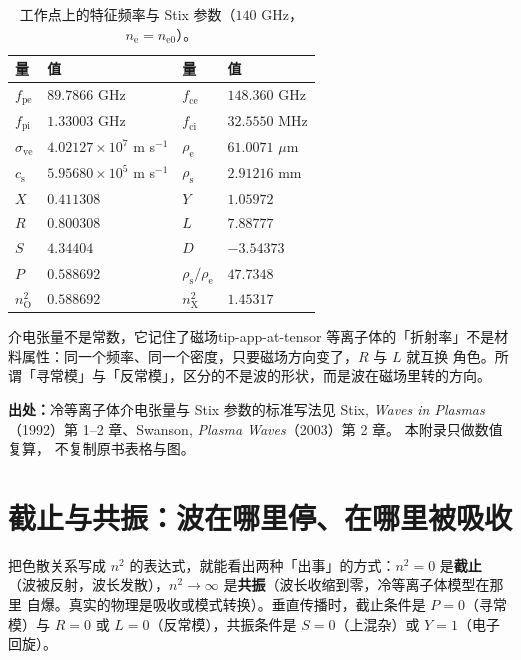 \begin{table}[htbp]
\centering
\small
\caption{工作点上的特征频率与 Stix 参数（$140$ GHz，$n_\mathrm{e}=n_\mathrm{e0}$）。}
\label{tab:app-at-tensor}
\begin{tabular}{p{4.4cm}p{3.3cm}p{4.4cm}p{3.3cm}}
\hline
量 & 值 & 量 & 值 \\
\hline
$f_\mathrm{pe}$ & $89.7866$ GHz & $f_\mathrm{ce}$ & $148.360$ GHz \\
$f_\mathrm{pi}$ & $1.33003$ GHz & $f_\mathrm{ci}$ & $32.5550$ MHz \\
$\sigma_\mathrm{ve}$ & $4.02127\times10^{7}$ m s$^{-1}$ & $\rho_\mathrm{e}$ & $61.0071$ $\mu$m \\
$c_\mathrm{s}$ & $5.95680\times10^{5}$ m s$^{-1}$ & $\rho_\mathrm{s}$ & $2.91216$ mm \\
$X$ & $0.411308$ & $Y$ & $1.05972$ \\
$R$ & $0.800308$ & $L$ & $7.88777$ \\
$S$ & $4.34404$ & $D$ & $-3.54373$ \\
$P$ & $0.588692$ & $\rho_\mathrm{s}/\rho_\mathrm{e}$ & $47.7348$ \\
$n_\mathrm{O}^2$ & $0.588692$ & $n_\mathrm{X}^2$ & $1.45317$ \\
\hline
\end{tabular}
\end{table}

\begin{tip}{介电张量不是常数，它记住了磁场}{tip-app-at-tensor}
等离子体的「折射率」不是材料属性：同一个频率、同一个密度，只要磁场方向变了，$R$ 与 $L$ 就互换
角色。所谓「寻常模」与「反常模」，区分的不是波的形状，而是波在磁场里转的方向。
\end{tip}

{\footnotesize
\textbf{出处：}冷等离子体介电张量与 Stix 参数的标准写法见 Stix, \emph{Waves in Plasmas}
（1992）第 1--2 章、Swanson, \emph{Plasma Waves}（2003）第 2 章。
本附录只做数值复算，
不复制原书表格与图。
}

\section{截止与共振：波在哪里停、在哪里被吸收}
\label{sec:app-at-cutoff}

把色散关系写成 $n^2$ 的表达式，就能看出两种「出事」的方式：$n^2=0$ 是\textbf{截止}
（波被反射，波长发散），$n^2\to\infty$ 是\textbf{共振}（波长收缩到零，冷等离子体模型在那里
自爆。真实的物理是吸收或模式转换）。垂直传播时，截止条件是 $P=0$（寻常模）与
$R=0$ 或 $L=0$（反常模），共振条件是 $S=0$（上混杂）或 $Y=1$（电子回旋）。


